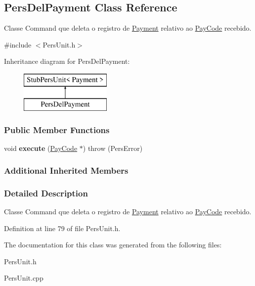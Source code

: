 \hypertarget{classPersDelPayment}{\subsection{Pers\-Del\-Payment Class Reference}
\label{da/d8c/classPersDelPayment}
}


Classe Command que deleta o registro de \hyperlink{classPayment}{Payment} relativo ao \hyperlink{classPayCode}{Pay\-Code} recebido.  




{\ttfamily \#include $<$Pers\-Unit.\-h$>$}

Inheritance diagram for Pers\-Del\-Payment\-:\begin{figure}[H]
\begin{center}
\leavevmode
\includegraphics[height=2.000000cm]{da/d8c/classPersDelPayment}
\end{center}
\end{figure}
\subsubsection*{Public Member Functions}
\begin{DoxyCompactItemize}
\item 
\hypertarget{classPersDelPayment_a92f9a6d1cdca92afb3fa71a217026864}{void {\bfseries execute} (\hyperlink{classPayCode}{Pay\-Code} $\ast$)  throw (\-Pers\-Error)}\label{da/d8c/classPersDelPayment_a92f9a6d1cdca92afb3fa71a217026864}

\end{DoxyCompactItemize}
\subsubsection*{Additional Inherited Members}


\subsubsection{Detailed Description}
Classe Command que deleta o registro de \hyperlink{classPayment}{Payment} relativo ao \hyperlink{classPayCode}{Pay\-Code} recebido. 

Definition at line 79 of file Pers\-Unit.\-h.



The documentation for this class was generated from the following files\-:\begin{DoxyCompactItemize}
\item 
Pers\-Unit.\-h\item 
Pers\-Unit.\-cpp\end{DoxyCompactItemize}
